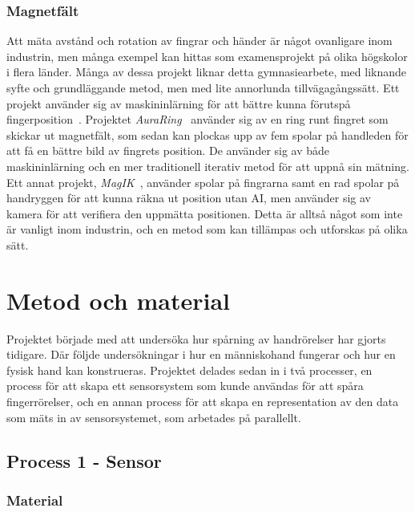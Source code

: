\documentclass[a4paper]{article}
\begin{document}
\begin{sloppypar}
  \subsubsection{Magnetfält}
  Att mäta avstånd och rotation av fingrar och händer är något ovanligare inom industrin, men många exempel kan hittas som examensprojekt på olika högskolor i flera länder.
  Många av dessa projekt liknar detta gymnasiearbete, med liknande syfte och grundläggande metod, men med lite annorlunda tillvägagångssätt.
  Ett projekt använder sig av maskininlärning för att bättre kunna förutspå fingerposition~\cite{article:sci-rep-mag-ind}.
  Projektet \textit{AuraRing}~\cite{article:AuraRing} använder sig av en ring runt fingret som skickar ut magnetfält, som sedan kan plockas upp av fem spolar på handleden för att få en bättre bild av fingrets position.
  De använder sig av både maskininlärning och en mer traditionell iterativ metod för att uppnå sin mätning.
  Ett annat projekt, \textit{MagIK}~\cite{article:MagIK}, använder spolar på fingrarna samt en rad spolar på handryggen för att kunna räkna ut position utan AI, men använder sig av kamera för att verifiera den uppmätta positionen.
  Detta är alltså något som inte är vanligt inom industrin, och en metod som kan tillämpas och utforskas på olika sätt.

  \section{Metod och material}


  Projektet började med att undersöka hur spårning av handrörelser har gjorts tidigare.
  Där följde undersökningar i hur en människohand fungerar och hur en fysisk hand kan konstrueras.
  Projektet delades sedan in i två processer, en process för att skapa ett sensorsystem som kunde användas för att spåra fingerrörelser,
  och en annan process för att skapa en representation av den data som mäts in av sensorsystemet, som arbetades på parallellt.

  \subsection{Process 1 - Sensor}

  \subsubsection{Material}


\end{sloppypar}
\end{document}
